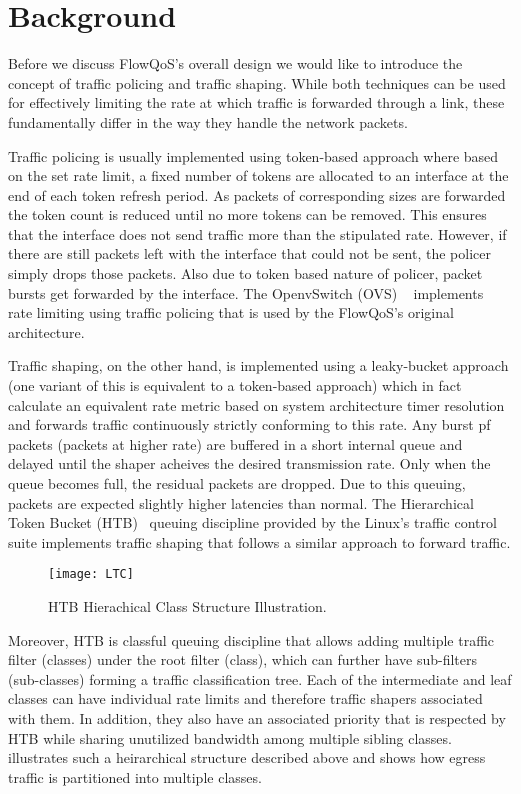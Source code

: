\section{Background}
\label{sec:background}

Before we discuss FlowQoS's overall design we would like to introduce the concept of traffic policing and traffic shaping. While both techniques can be used for effectively limiting the rate at which traffic is forwarded through a link, these fundamentally differ in the way they handle the network packets.

Traffic policing is usually implemented using token-based approach where based on the set rate limit, a fixed number of tokens are allocated to an interface at the end of each token refresh period. As packets of corresponding sizes are forwarded the token count is reduced until no more tokens can be removed. This ensures that the interface does not send traffic more than the stipulated rate. However, if there are still packets left with the interface that could not be sent, the policer simply drops those packets. Also due to token based nature of policer, packet bursts get forwarded by the interface. The OpenvSwitch (OVS) ~\cite{ovs} implements rate limiting using traffic policing that is used by the FlowQoS's original architecture.

Traffic shaping, on the other hand, is implemented using a leaky-bucket approach (one variant of this is equivalent to a token-based approach) which in fact calculate an equivalent rate metric based on system architecture timer resolution and forwards traffic continuously strictly conforming to this rate. Any burst pf packets (packets at higher rate) are buffered in a short internal queue and delayed until the shaper acheives the desired transmission rate. Only when the queue becomes full, the residual packets are dropped. Due to this queuing, packets are expected slightly higher latencies than normal. The Hierarchical Token Bucket (HTB)~\cite{htb_manual} queuing discipline provided by the Linux's traffic control suite implements traffic shaping that follows a similar approach to forward traffic.

\begin{figure}[t]
\centering
\texttt{[image: LTC]}
\caption{HTB Hierachical Class Structure Illustration.}
\label{fig:htb}
\end{figure}

Moreover, HTB is classful queuing discipline that allows adding multiple traffic filter (classes) under the root filter (class), which can further have sub-filters (sub-classes) forming a traffic classification tree. Each of the intermediate and leaf classes can have individual rate limits and therefore traffic shapers associated with them. In addition, they also have an associated priority that is respected by HTB while sharing unutilized bandwidth among multiple sibling classes. ~ illustrates such a heirarchical structure described above and shows how egress traffic is partitioned into multiple classes.\\

